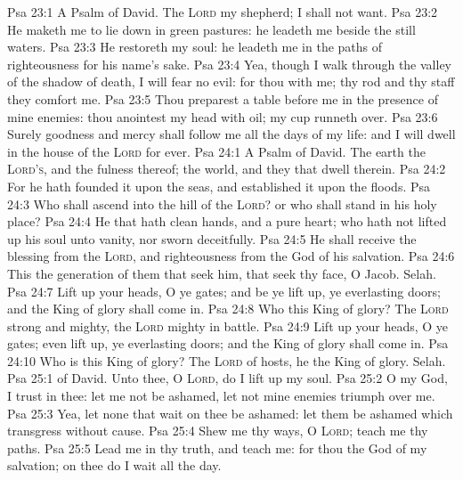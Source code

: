 \vs Psa 23:1 A Psalm of David. The \textsc{Lord}  my shepherd; I shall not want.
\vs Psa 23:2 He maketh me to lie down in green pastures: he leadeth me beside the still waters.
\vs Psa 23:3 He restoreth my soul: he leadeth me in the paths of righteousness for his name's sake.
\vs Psa 23:4 Yea, though I walk through the valley of the shadow of death, I will fear no evil: for thou  with me; thy rod and thy staff they comfort me.
\vs Psa 23:5 Thou preparest a table before me in the presence of mine enemies: thou anointest my head with oil; my cup runneth over.
\vs Psa 23:6 Surely goodness and mercy shall follow me all the days of my life: and I will dwell in the house of the \textsc{Lord} for ever.
\vs Psa 24:1 A Psalm of David. The earth  the \textsc{Lord's}, and the fulness thereof; the world, and they that dwell therein.
\vs Psa 24:2 For he hath founded it upon the seas, and established it upon the floods.
\vs Psa 24:3 Who shall ascend into the hill of the \textsc{Lord}? or who shall stand in his holy place?
\vs Psa 24:4 He that hath clean hands, and a pure heart; who hath not lifted up his soul unto vanity, nor sworn deceitfully.
\vs Psa 24:5 He shall receive the blessing from the \textsc{Lord}, and righteousness from the God of his salvation.
\vs Psa 24:6 This  the generation of them that seek him, that seek thy face, O Jacob. Selah.
\vs Psa 24:7 Lift up your heads, O ye gates; and be ye lift up, ye everlasting doors; and the King of glory shall come in.
\vs Psa 24:8 Who  this King of glory? The \textsc{Lord} strong and mighty, the \textsc{Lord} mighty in battle.
\vs Psa 24:9 Lift up your heads, O ye gates; even lift  up, ye everlasting doors; and the King of glory shall come in.
\vs Psa 24:10 Who is this King of glory? The \textsc{Lord} of hosts, he  the King of glory. Selah.
\vs Psa 25:1  of David. Unto thee, O \textsc{Lord}, do I lift up my soul.
\vs Psa 25:2 O my God, I trust in thee: let me not be ashamed, let not mine enemies triumph over me.
\vs Psa 25:3 Yea, let none that wait on thee be ashamed: let them be ashamed which transgress without cause.
\vs Psa 25:4 Shew me thy ways, O \textsc{Lord}; teach me thy paths.
\vs Psa 25:5 Lead me in thy truth, and teach me: for thou  the God of my salvation; on thee do I wait all the day.
